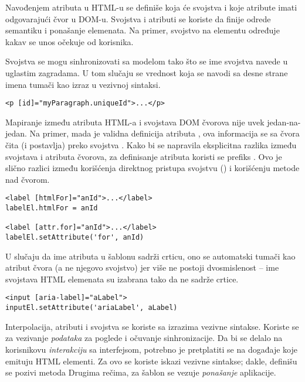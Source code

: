 Navođenjem atributa u HTML-u se definiše koja će svojstva i koje atribute imati odgovarajući čvor u DOM-u.
Svojstva i atributi se koriste da finije odrede semantiku i ponašanje elemenata.
Na primer, svojstvo  na  elementu određuje kakav se unos očekuje od korisnika.

Svojstva se mogu sinhronizovati sa modelom tako što se ime svojstva navede u uglastim zagradama.
U tom slučaju se vrednost koja se navodi sa desne strane imena tumači kao izraz u vezivnoj sintaksi.

\begin{verbatim}
<p [id]="myParagraph.uniqueId">...</p>
\end{verbatim}

Mapiranje između atributa HTML-a i svojstava DOM čvorova nije uvek jedan-na-jedan.
Na primer, mada je  validna definicija atributa , ova informacija se sa čvora čita (i postavlja) preko svojstva .
Kako bi se napravila eksplicitna razlika između svojstava i atributa čvorova, za definisanje atributa koristi se prefiks .
Ovo je slično razlici između korišćenja direktnog pristupa svojstvu () i korišćenju metode  nad čvorom.

\begin{verbatim}
<label [htmlFor]="anId">...</label>
labelEl.htmlFor = anId

<label [attr.for]="anId">...</label>
labelEl.setAttribute('for', anId)
\end{verbatim}

U slučaju da ime atributa u šablonu sadrži crticu, ono se automatski tumači kao atribut čvora (a ne njegovo svojstvo) jer više ne postoji dvosmislenost -- ime svojstava HTML elemenata su izabrana tako da ne sadrže crtice.

\begin{verbatim}
<input [aria-label]="aLabel">
inputEl.setAttribute('ariaLabel', aLabel)
\end{verbatim}

Interpolacija, atributi i svojstva se koriste sa izrazima vezivne sintakse.
Koriste se za vezivanje \emph{podataka} za poglede i očuvanje sinhronizacije.
Da bi se delalo na korisnikovu \emph{interakciju} sa interfejsom, potrebno je pretplatiti se na događaje koje emituju HTML elementi.
Za ovo se koriste iskazi vezivne sintakse; dakle, definišu se pozivi metoda
Drugima rečima, za šablon se vezuje \emph{ponašanje} aplikacije.

